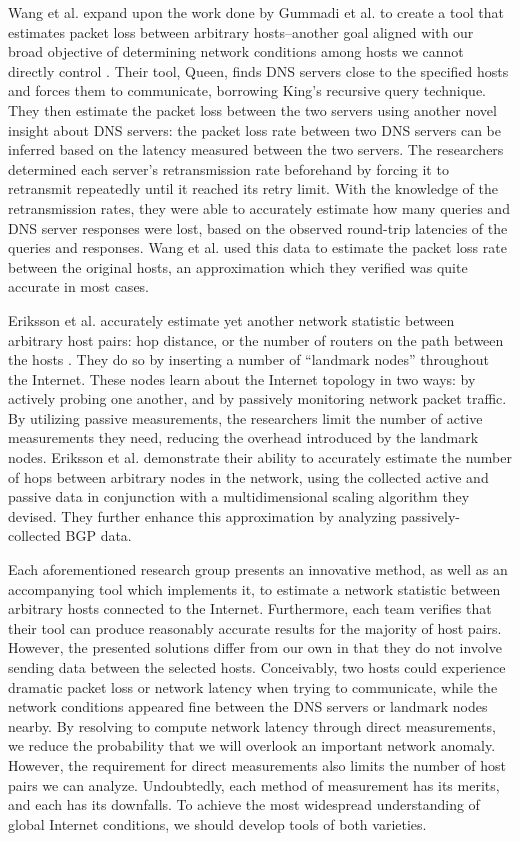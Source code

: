 \documentclass[twocolumn,11pt]{article}
\begin{document}
Wang et al. expand upon the work done by Gummadi et al. to create a tool that estimates packet loss between arbitrary hosts--another goal aligned with our broad objective of determining network conditions among hosts we cannot directly control \cite{Wang}. Their tool, Queen, finds DNS servers close to the specified hosts and forces them to communicate, borrowing King's recursive query technique. They then estimate the packet loss between the two servers using another novel insight about DNS servers: the packet loss rate between two DNS servers can be inferred based on the latency measured between the two servers. The researchers determined each server's retransmission rate beforehand by forcing it to retransmit repeatedly until it reached its retry limit. With the knowledge of the retransmission rates, they were able to accurately estimate how many queries and DNS server responses were lost, based on the observed round-trip latencies of the queries and responses. Wang et al. used this data to estimate the packet loss rate between the original hosts, an approximation which they verified was quite accurate in most cases.

Eriksson et al. accurately estimate yet another network statistic between arbitrary host pairs: hop distance, or the number of routers on the path between the hosts \cite{Eriksson}. They do so by inserting a number of ``landmark nodes'' throughout the Internet. These nodes learn about the Internet topology in two ways: by actively probing one another, and by passively monitoring network packet traffic. By utilizing passive measurements, the researchers limit the number of active measurements they need, reducing the overhead introduced by the landmark nodes. Eriksson et al. demonstrate their ability to accurately estimate the number of hops between arbitrary nodes in the network, using the collected active and passive data in conjunction with a multidimensional scaling algorithm they devised. They further enhance this approximation by analyzing passively-collected BGP data.

Each aforementioned research group presents an innovative method, as well as an accompanying tool which implements it, to estimate a network statistic between arbitrary hosts connected to the Internet. Furthermore, each team verifies that their tool can produce reasonably accurate results for the majority of host pairs. However, the presented solutions differ from our own in that they do not involve sending data between the selected hosts. Conceivably, two hosts could experience dramatic packet loss or network latency when trying to communicate, while the network conditions appeared fine between the DNS servers or landmark nodes nearby. By resolving to compute network latency through direct measurements, we reduce the probability that we will overlook an important network anomaly. However, the requirement for direct measurements also limits the number of host pairs we can analyze. Undoubtedly, each method of measurement has its merits, and each has its downfalls. To achieve the most widespread understanding of global Internet conditions, we should develop tools of both varieties.
\end{document}
